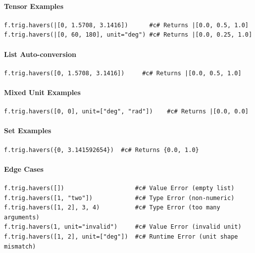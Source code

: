 \paragraph{Tensor Examples}
\begin{verbatim}
f.trig.havers(|[0, 1.5708, 3.1416])      #c# Returns |[0.0, 0.5, 1.0]
f.trig.havers(|[0, 60, 180], unit="deg") #c# Returns |[0.0, 0.25, 1.0]
\end{verbatim}

\paragraph{List Auto-conversion}
\begin{verbatim}
f.trig.havers([0, 1.5708, 3.1416])     #c# Returns |[0.0, 0.5, 1.0]
\end{verbatim}

\paragraph{Mixed Unit Examples}
\begin{verbatim}
f.trig.havers([0, 0], unit=["deg", "rad"])    #c# Returns |[0.0, 0.0]
\end{verbatim}

\paragraph{Set Examples}
\begin{verbatim}
f.trig.havers({0, 3.141592654})  #c# Returns {0.0, 1.0}
\end{verbatim}

\paragraph{Edge Cases}
\begin{verbatim}
f.trig.havers([])                    #c# Value Error (empty list)
f.trig.havers([1, "two"])            #c# Type Error (non-numeric)
f.trig.havers([1, 2], 3, 4)          #c# Type Error (too many arguments)
f.trig.havers(1, unit="invalid")     #c# Value Error (invalid unit)
f.trig.havers([1, 2], unit=["deg"])  #c# Runtime Error (unit shape mismatch)
\end{verbatim}

